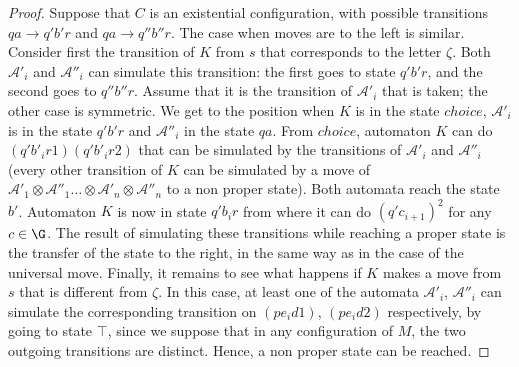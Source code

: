 \documentclass{LMCS}
\theoremstyle{plain}\newtheorem{remark}{Remark}
\theoremstyle{plain}\newtheorem{lemma}[thm]{Lemma}
\renewcommand{\Aa}{\mathcal{A}}
\newcommand{\vAap}{\Aa'_1\otimes\Aa''_1\dots\otimes\Aa'_n\otimes\Aa''_n}
\newcommand{\choice}{\zeta}
\newcommand{\cchoice}{\mathit{choice}}
\begin{document}
\begin{proof}
  Suppose that $C$ is an existential configuration, with possible
  transitions $qa\to q'b'r$ and $qa\to q''b''r$. The case when moves
  are to the left is similar.  Consider first the transition of $K$
  from $s$ that corresponds to the letter $\choice$.  Both $\Aa'_i$
  and $\Aa''_i$ can simulate this transition: the first goes to state
  $q'b'r$, and the second goes to $q''b''r$. Assume that it is the
  transition of $\Aa'_i$ that is taken; the other case is
  symmetric. We get to the position when $K$ is in the state
  $\cchoice$, $\Aa'_i$ is in the state $q'b'r$ and $\Aa''_i$ in the
  state $qa$. From $\cchoice$, automaton $K$ can do
  $(q'b'_ir1)(q'b'_ir2)$ that can be simulated by the transitions of
  $\Aa'_i$ and $\Aa''_i$ (every other transition of $K$ can be
  simulated by a move of $\vAap$ to a non proper state).  Both
  automata reach the state $b'$. Automaton $K$ is now in state
  $q'b_ir$ from where it can do $(q'c_{i+1})^2$ for any $c\in \G$. The
  result of simulating these transitions while reaching a proper state
  is the transfer of the state to the right, in the same way as in the
  case of the universal move. Finally, it remains to see what happens
  if $K$ makes a move from $s$ that is different from $\choice$.  In
  this case, at least one of the automata $\Aa'_i$, $\Aa''_i$ can
  simulate the corresponding transition on $(p e_id1)$, $(p e_id2)$
  respectively, by going to state $\top$, since we suppose that in any
  configuration of $M$, the two outgoing transitions are
  distinct. Hence, a non proper state can be reached.
\end{proof}
\end{document}
